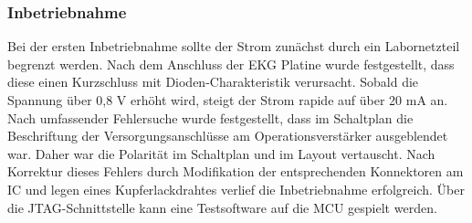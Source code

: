 \subsubsection{Inbetriebnahme}
Bei der ersten Inbetriebnahme sollte der Strom zunächst durch ein Labornetzteil begrenzt werden. Nach dem Anschluss der EKG Platine wurde festgestellt, dass diese einen Kurzschluss mit Dioden-Charakteristik verursacht. Sobald die Spannung über 0,8 V erhöht wird, steigt der Strom rapide auf über 20 mA an. Nach umfassender Fehlersuche wurde festgestellt, dass im Schaltplan die Beschriftung der Versorgungsanschlüsse am Operationsverstärker ausgeblendet war. Daher war die Polarität im Schaltplan und im Layout vertauscht. Nach Korrektur dieses Fehlers durch Modifikation der entsprechenden Konnektoren am IC und legen eines Kupferlackdrahtes verlief die Inbetriebnahme erfolgreich. Über die JTAG-Schnittstelle kann eine Testsoftware auf die MCU gespielt werden.